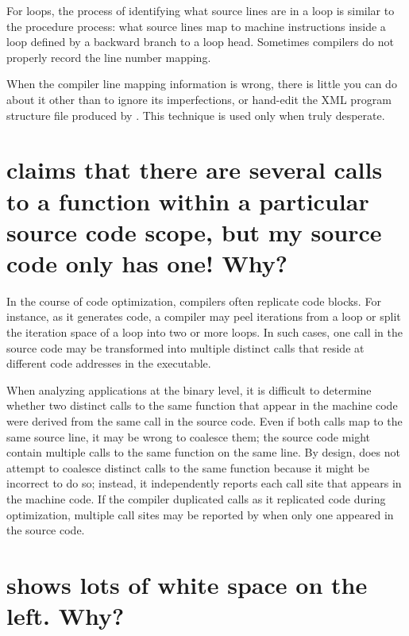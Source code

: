 \documentclass[11pt,letterpaper]{report}
\begin{document}
For loops, the process of identifying what source lines are in a loop is similar to the procedure process: what source lines map to machine instructions inside a loop defined by a backward branch to a loop head.
Sometimes compilers do not properly record the line number mapping.

When the compiler line mapping information is wrong, there is little you can do about it other than to ignore its imperfections, or hand-edit the XML program structure file produced by \hpcstruct{}.
This technique is used only when truly desperate.



\section{\hpcviewer{} claims that there are several calls to a function within a particular source code scope, but my source code only has one!  Why?}

In the course of code optimization, compilers often replicate code blocks.
For instance, as it generates code, a compiler may peel iterations from a loop or split the iteration space of a loop into two or more loops.
In such cases, one call in the source code may be transformed into multiple distinct calls that reside at different code addresses in the executable.

When analyzing applications at the binary level, it is difficult to determine whether two distinct calls to the same function that appear in the machine code were derived from the same call in the source code.
Even if both calls map to the same source line, it may be wrong to coalesce them; the source code might contain multiple calls to the same function on the same line.
By design, \HPCToolkit{} does not attempt to coalesce distinct calls to the same function because it might be incorrect to do so; instead, it independently reports each call site that appears in the machine code.
If the compiler duplicated calls as it replicated code during optimization, multiple call sites may be reported by \hpcviewer{} when only one appeared in the source code.


\section{\hpctraceviewer{} shows lots of white space on the left. Why?}
\end{document}
